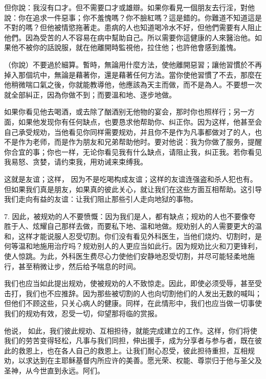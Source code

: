 但你說：我沒有口才。但不需要口才或雄辯。如果你看見一個朋友去行淫，對他說：你在追求一件惡事；你不羞愧嗎？你不臉紅嗎？這是錯的。你難道不知道這是不對的嗎？但他被情慾拖著走。患病的人也知道喝冷水不好，但他們需要有人阻止他們。因為受苦的人不容易在病中幫助自己。所以需要你這健康的人來醫治他。如果他不被你的話說服，就在他離開時監視他，拉住他；也許他會感到羞愧。\par

（你說）不要過於細算。暫時，無論用什麼方法，使他離開惡習；讓他習慣於不再掉入那個坑中，無論是藉著你，還是藉著任何方法。當你使他習慣了不去，那麼在他稍微喘口氣之後，你就能教導他，他應該為天主而做，而不是為人。不要想一次就全部糾正，因為你做不到；而要溫和地、逐步地做。\par

如果你看见他去喝酒，或去除了酗酒别无他物的宴会，那时你也照样行；另一方面，如果他发现你有任何缺点，也要恳求他帮助你、纠正你。因为这样，他甚至会自己承受规劝，当他看见你同样需要规劝，并且你不是作为凡事都做对了的人，也不是作为老师，而是作为朋友和兄弟帮助他时。要对他说：我为你做了服务，提醒你合宜的事；你也一样，无论你看见我有什么缺点，请阻止我，纠正我。若你看见我易怒、贪婪，请约束我，用劝诫来束缚我。\par

这就是友谊；这样，  因为不是吃喝构成友谊；这样的友谊连强盗和杀人犯也有。但如果我们真是朋友，如果真的彼此关心，就让我们在这些方面互相帮助。这引导我们走向有益的友谊：让我们阻止那些引人走向地狱的事物。\par

7. 因此，被规劝的人不要愤慨：因为我们是人，都有缺点；规劝的人也不要像夸胜于人、炫耀自己那样去做，而要私下地、温和地做。规劝别人的人需要更大的温和，这样才能说服人忍受切割。你们没有看见外科医生，当他们烧灼、切割时，是何等温和地施用治疗吗？规劝别人的人更应当如此行。因为规劝比火和刀更锋利，使人惊跳。为此，外科医生费尽心力使他们安静地忍受切割，并尽可能轻柔地施行，甚至稍微让步，然后给予喘息的时间。\par

我们也应当如此提出规劝，使被规劝的人不致惊走。因此，即使必须受辱，甚至受击打，我们也不应推辞。因为那些被切割的人也向切割他们的人发出无数的喊叫；但他们不顾这些，只关心病人的健康。同样，在此情形中，我们也应当做一切事使我们的规劝有效，忍受一切，仰望那将临的赏报。\par

 他说，  如此，我们彼此规劝、互相担待，就能完成建立的工作。这样，你们将使我们的劳苦变得轻松，凡事与我们同担，伸出援手，成为分享者与参与者，既在彼此的救恩上，也在各人自己的救恩上。让我们耐心忍受，彼此担待重担，互相规劝，以求达到在主耶稣基督内所应许的美善。愿光荣、权能、尊崇归于他与圣父及圣神，从今世直到永远。阿们。\par

